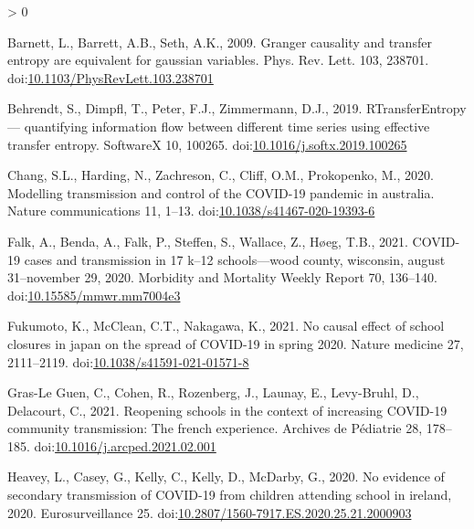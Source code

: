 \documentclass[]{elsarticle} %
\newlength{\cslhangindent}
\newenvironment{CSLReferences}[2] %
 {%
  \setlength{\parindent}{0pt}
  \ifodd #1 \everypar{\setlength{\hangindent}{\cslhangindent}}\ignorespaces\fi
  \ifnum #2 > 0
  \setlength{\parskip}{#2\baselineskip}
  \fi
 }%
 {}
\begin{document}
\hypertarget{refs}{}
\begin{CSLReferences}{1}{0}
\leavevmode\hypertarget{ref-barnett2009granger}{}%
Barnett, L., Barrett, A.B., Seth, A.K., 2009. Granger causality and transfer entropy are equivalent for gaussian variables. Phys. Rev. Lett. 103, 238701. doi:\href{https://doi.org/10.1103/PhysRevLett.103.238701}{10.1103/PhysRevLett.103.238701}

\leavevmode\hypertarget{ref-behrendt2019rtransferentropy}{}%
Behrendt, S., Dimpfl, T., Peter, F.J., Zimmermann, D.J., 2019. RTransferEntropy --- quantifying information flow between different time series using effective transfer entropy. SoftwareX 10, 100265. doi:\href{https://doi.org/10.1016/j.softx.2019.100265}{10.1016/j.softx.2019.100265}

\leavevmode\hypertarget{ref-chang2020modelling}{}%
Chang, S.L., Harding, N., Zachreson, C., Cliff, O.M., Prokopenko, M., 2020. Modelling transmission and control of the COVID-19 pandemic in australia. Nature communications 11, 1--13. doi:\href{https://doi.org/10.1038/s41467-020-19393-6}{10.1038/s41467-020-19393-6}

\leavevmode\hypertarget{ref-falk2021covid}{}%
Falk, A., Benda, A., Falk, P., Steffen, S., Wallace, Z., Høeg, T.B., 2021. COVID-19 cases and transmission in 17 k--12 schools---wood county, wisconsin, august 31--november 29, 2020. Morbidity and Mortality Weekly Report 70, 136--140. doi:\href{https://doi.org/10.15585/mmwr.mm7004e3}{10.15585/mmwr.mm7004e3}

\leavevmode\hypertarget{ref-fukumoto2021no}{}%
Fukumoto, K., McClean, C.T., Nakagawa, K., 2021. No causal effect of school closures in japan on the spread of COVID-19 in spring 2020. Nature medicine 27, 2111--2119. doi:\href{https://doi.org/10.1038/s41591-021-01571-8}{10.1038/s41591-021-01571-8}

\leavevmode\hypertarget{ref-grasleguen2021reopening}{}%
Gras-Le Guen, C., Cohen, R., Rozenberg, J., Launay, E., Levy-Bruhl, D., Delacourt, C., 2021. Reopening schools in the context of increasing COVID-19 community transmission: The french experience. Archives de Pédiatrie 28, 178--185. doi:\href{https://doi.org/10.1016/j.arcped.2021.02.001}{10.1016/j.arcped.2021.02.001}

\leavevmode\hypertarget{ref-heavey2020evidence}{}%
Heavey, L., Casey, G., Kelly, C., Kelly, D., McDarby, G., 2020. No evidence of secondary transmission of COVID-19 from children attending school in ireland, 2020. Eurosurveillance 25. doi:\href{https://doi.org/10.2807/1560-7917.ES.2020.25.21.2000903}{10.2807/1560-7917.ES.2020.25.21.2000903}


\end{CSLReferences}
\end{document}
